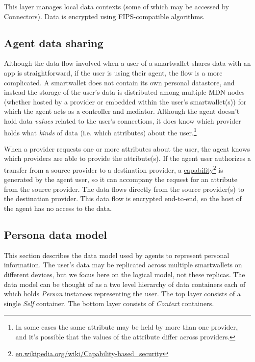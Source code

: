 \documentclass[11pt, oneside]{article}   	%
\newcommand{\hyperfootnote}[1][]{\def\ArgI{{#1}}\hyperfootnoteRelay}
\newcommand\hyperfootnoteRelay[2][]{\href{#1#2}{\ArgI}\footnote{\href{#1#2}{#2}}}
\begin{document}
This layer manages local data contexts (some of which may be accessed by Connectors). Data is encrypted using FIPS-compatible algorithms. 

\subsection{Agent data sharing}

Although the data flow involved when a user of a smartwallet shares data with an app is straightforward, if the user is using their agent, the flow is a more complicated. A smartwallet does not contain its own personal datastore, and instead the storage of the user's data is distributed among multiple MDN nodes (whether hosted by a provider or embedded within the user's smartwallet(s)) for which the agent acts as a controller and mediator. Although the agent doesn't hold data \emph{values} related to the user's connections, it does know which provider holds what \emph{kinds} of data (i.e. which attributes) about the user.\footnote{In some cases the same attribute may be held by more than one provider, and it's possible that the values of the attribute differ across providers.}

When a provider requests one or more attributes about the user, the agent knows which providers are able to provide the attribute(s). If the agent user authorizes a transfer from a source provider to a destination provider, a \hyperfootnote[capability][https://]{en.wikipedia.org/wiki/Capability-based\_security} is generated by the agent user, so it can accompany the request for an attribute from the source provider. The data flows directly from the source provider(s) to the destination provider. This data flow is encrypted end-to-end, so the host of the agent has no access to the data. 

\subsection{Persona data model}\label{data_model_subsection} 

This section describes the data model used by agents to represent personal information. The user's data may be replicated across multiple smartwallets on different devices, but we focus here on the logical model, not these replicas. The data model can be thought of as a two level hierarchy of data containers each of which holds \emph{Person} instances representing the user. The top layer consists of a single \emph{Self} container. The bottom layer consists of \emph{Context} containers.
\end{document}
